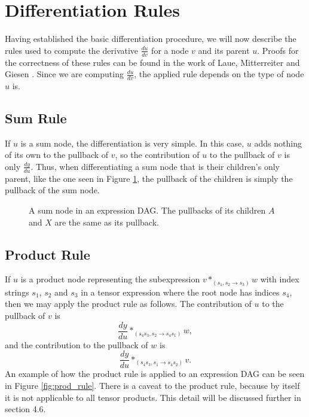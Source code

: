 \documentclass[12pt, a4paper]{report} %
\begin{document}
\section{Differentiation Rules}
Having established the basic differentiation procedure, we will now describe the rules used to compute the derivative $\frac{du}{dv}$ for a node $v$ and its parent $u$.
Proofs for the correctness of these rules can be found in the work of Laue, Mitterreiter and Giesen \cite{tensorpaper}.
Since we are computing $\frac{du}{dv}$, the applied rule depends on the type of node $u$ is.

\subsection{Sum Rule}
If $u$ is a sum node, the differentiation is very simple.
In this case, $u$ adds nothing of its own to the pullback of $v$, so the contribution of $u$ to the pullback of $v$ is only $\frac{dy}{du}$.
Thus, when differentiating a sum node that is their children's only parent, like the one seen in Figure \ref{fig:sum_rule}, the pullback of the children is simply the pullback of the sum node.

\begin{figure}
    \centering
    \caption[Example of Sum Rule Application]{A sum node in an expression DAG. The pullbacks of its children $A$ and $X$ are the same as its pullback.}
    \label{fig:sum_rule}
\end{figure}

\subsection{Product Rule}
If $u$ is a product node representing the subexpression $v *_{(s_1,s_2 \rightarrow s_3)} w$ with index strings $s_1$, $s_2$ and $s_3$ in a tensor expression where the root node has indices $s_4$, then we may apply the product rule as follows.
The contribution of $u$ to the pullback of $v$ is 
$$
\frac{dy}{du} *_{(s_4s_3,s_2 \rightarrow s_4s_1)} w,
$$
and the contribution to the pullback of $w$ is 
$$
\frac{dy}{du} *_{(s_4s_3,s_1 \rightarrow s_4s_2)} v.
$$
An example of how the product rule is applied to an expression DAG can be seen in Figure \ref{fig:prod_rule}.
There is a caveat to the product rule, because by itself it is not applicable to all tensor products.
This detail will be discussed further in section 4.6.
\end{document}

